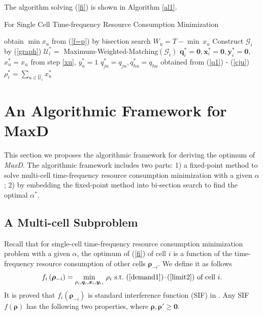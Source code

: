 \documentclass[10pt,journal,final,finalsubmission,twocolumn]{IEEEtran}
\begin{document}
The algorithm solving (\ref{fi}) is shown in Algorithm \ref{al1}.

 \begin{algorithm}[tbp]\label{al1}
\caption{For Single Cell Time-frequency Resource Consumption Minimization} 
{
	obtain $\min x_u$ from (\ref{f=p}) by bisection search\label{xu}\;
	$W_u = T - \min \ x_u$\;
}
Construct $\mathcal{G}_i$ by (\ref{graph})\;
$\mathcal{U}^*_i= $ Maximum-Weighted-Matching$\left (\mathcal{G}_i\right)$\label{MWM}\;
$\boldsymbol{q}^*_i = \boldsymbol{0},\boldsymbol{x}^*_i = \boldsymbol{0}, \boldsymbol{y}^*_i = \boldsymbol{0},$\;
{
$x_u^* = x_u$ from step \ref{xu}, $y_u^*=1$\;
$q_{ju}^*=q_{ju}, q_{hu}^*=q_{hu}$ obtained from (\ref{q1}) - (\ref{cju})\;
}
$\rho_i^*=\sum_{u\in\widehat{\mathcal{U}}_i} x_u^*$\;
\;
\end{algorithm} 


\section{An Algorithmic Framework for MaxD}\label{CellLoadsMinimization}

This section we proposes the algorithmic framework for deriving the optimum of {\em MaxD}. The algorithmic framework includes two parts: 1) a fixed-point method to solve multi-cell time-frequency resource consumption minimization with a given $\alpha$; 2) by embedding the fixed-point method into bi-section search to find the optimal $\alpha^*$.

\subsection{A Multi-cell Subproblem }\label{MulticellLoadsMinimization}

Recall that for single-cell time-frequency resource consumption minimization problem with a given $\alpha$, the optimum of (\ref{fi}) of cell $i$ is a function of the time-frequency resource consumption of other cells $\boldsymbol{\rho}_{-i}$. We define it as follows
\begin{equation}\label{fi2}
f_i\left (\boldsymbol{\rho}_{-i}\right ) =  \underset{\rho_i, \boldsymbol{q}_i,\boldsymbol{x}_i,\boldsymbol{y}_i,}{\min} \ \rho_i\  \textup{s.t.\ (\ref{demand1})--(\ref{limit2}) of cell $i$} .
\end{equation}
It is proved that $f_i\left (\boldsymbol{\rho}_{-i}\right )$ is standard interference function (SIF) in \cite{Yates}. Any SIF $f\left( \boldsymbol{\rho}\right)$ has the following two properties, where $\boldsymbol{\rho}, \boldsymbol{\rho}' \geq \boldsymbol{0}$.
\end{document}
